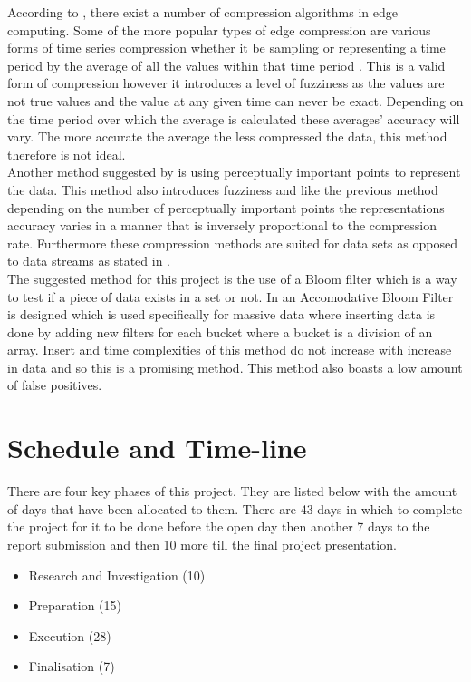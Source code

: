\documentclass[11pt,journal, a4paper]{IEEEtran}
\begin{document}
\noindent
According to \cite{accelerating}, there exist a number of compression algorithms in edge computing. Some of the more popular types of edge compression are various forms of time series compression whether it be sampling or representing a time period by the average of all the values within that time period \cite{time1}. This is a valid form of compression however it introduces a level of fuzziness as the values are not true values and the value at any given time can never be exact. Depending on the time period over which the average is calculated these averages' accuracy will vary. The more accurate the average the less compressed the data, this method therefore is not ideal. \\

\noindent
Another method suggested by \cite{PIP} is using perceptually important points to represent the data. This method also introduces fuzziness and like the previous method depending on the number of perceptually important points the representations accuracy varies in a manner that is inversely proportional to the compression rate.  Furthermore these compression methods are suited for data sets as opposed to data streams as stated in \cite{accelerating}. \\

\noindent
The suggested method for this project is the use of a Bloom filter which is a way to  test if a piece of data exists in a set or not. 
In \cite{Bloom2} an Accomodative Bloom Filter is designed which is used specifically for massive data where inserting data is done by adding new filters for each bucket where a bucket is a division of an array. Insert and time complexities of this method do not increase with increase in data and so this is a promising method. This method also boasts a low amount of false positives. 

\section{Schedule and Time-line}
\noindent
There are four key phases of this project. They are listed below with the amount of days that have been allocated to them. There are 43 days in which to complete the project for it to be done before the open day then another 7 days to the report submission and then 10 more till the final project presentation.\\

\begin{itemize}
\item Research and Investigation (10)
\item Preparation (15)
\item Execution (28)
\item Finalisation (7)
\end{itemize}
 
\end{document}
